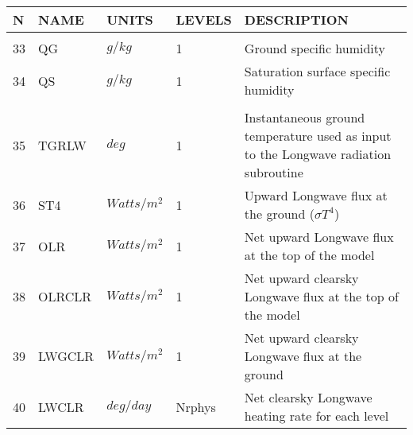 \newpage
\vspace*{\fill}
\begin{tabular}{lllll}
\hline\hline
N & NAME & UNITS & LEVELS & DESCRIPTION \\
\hline

&\\
33 & QG        &  $g/kg$ &  1
         &\begin{minipage}[t]{3in}
          {Ground specific humidity}
         \end{minipage}\\
34 & QS        &  $g/kg$ &  1
         &\begin{minipage}[t]{3in}
          {Saturation surface specific humidity}
         \end{minipage}\\

&\\
35 & TGRLW    &    $deg$   &    1  
         &\begin{minipage}[t]{3in}
          {Instantaneous ground temperature used as input to the
           Longwave radiation subroutine} 
         \end{minipage}\\
36 & ST4      &   $Watts/m^2$  &    1  
         &\begin{minipage}[t]{3in}
          {Upward Longwave flux at the ground ($\sigma T^4$)}
         \end{minipage}\\
37 & OLR      &   $Watts/m^2$  &    1  
         &\begin{minipage}[t]{3in}
          {Net upward Longwave flux at the top of the model}
         \end{minipage}\\
38 & OLRCLR   &   $Watts/m^2$  &    1  
         &\begin{minipage}[t]{3in}
          {Net upward clearsky Longwave flux at the top of the model}
         \end{minipage}\\
39 & LWGCLR   &   $Watts/m^2$  &    1  
         &\begin{minipage}[t]{3in}
          {Net upward clearsky Longwave flux at the ground}
         \end{minipage}\\
40 & LWCLR    &  $deg/day$ &  Nrphys 
         &\begin{minipage}[t]{3in}
          {Net clearsky Longwave heating rate for each level}
         \end{minipage}\\

\end{tabular}
